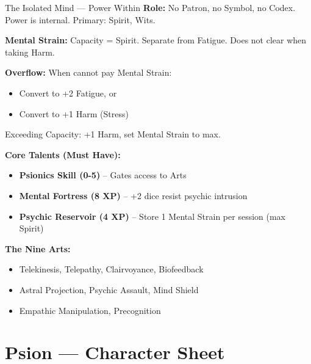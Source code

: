 \documentclass[10pt]{article}
\begin{document}
\begin{tipbox}{The Isolated Mind --- Power Within}
    \textbf{Role:} No Patron, no Symbol, no Codex. Power is internal. Primary: Spirit, Wits.
    
    \textbf{Mental Strain:} Capacity = Spirit. Separate from Fatigue. Does not clear when taking Harm.
    
    \textbf{Overflow:} When cannot pay Mental Strain:
    \begin{itemize}
        \item Convert to +2 Fatigue, or
        \item Convert to +1 Harm (Stress)
    \end{itemize}
    Exceeding Capacity: +1 Harm, set Mental Strain to max.
    
    \textbf{Core Talents (Must Have):}
    \begin{itemize}
        \item \textbf{Psionics Skill (0-5)} -- Gates access to Arts
        \item \textbf{Mental Fortress (8 XP)} -- +2 dice resist psychic intrusion
        \item \textbf{Psychic Reservoir (4 XP)} -- Store 1 Mental Strain per session (max Spirit)
    \end{itemize}
    
    \textbf{The Nine Arts:}
    \begin{itemize}
        \item Telekinesis, Telepathy, Clairvoyance, Biofeedback
        \item Astral Projection, Psychic Assault, Mind Shield
        \item Empathic Manipulation, Precognition
    \end{itemize}
\end{tipbox}

\newpage

\section*{Psion --- Character Sheet}
\end{document}
